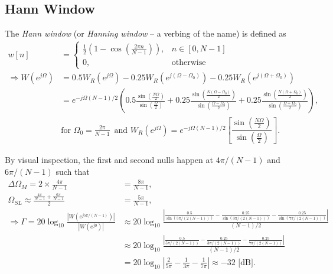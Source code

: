 \documentclass{report}
\begin{document}
\subsection{Hann Window}
The \emph{Hann window} (or \emph{Hanning window} -- a verbing of the name) is defined as 
\begin{align}
    w[n] &= \begin{cases}
        \frac{1}{2}\left(1-\cos\left(\frac{2\pi n}{N-1}\right)\right), & n\in[0,N-1] \\
        0, & \text{otherwise}
    \end{cases} \\
    \Longrightarrow W(e^{j\Omega}) &= 0.5W_R(e^{j\Omega}) - 0.25W_R(e^{j(\Omega-\Omega_0)}) - 0.25W_R(e^{j(\Omega+\Omega_0)}) \nonumber \\
    &= e^{-j\Omega(N-1)/2} \left(0.5\frac{\sin\left(\frac{N\Omega}{2}\right)}{\sin\left(\frac{\Omega}{2}\right)}+0.25\frac{\sin\left(\frac{N\left(\Omega-\Omega_0\right)}{2}\right)}{\sin\left(\frac{\Omega-\Omega_0}{2}\right)}+0.25\frac{\sin\left(\frac{N\left(\Omega+\Omega_0\right)}{2}\right)}{\sin\left(\frac{\Omega+\Omega_0}{2}\right)}\right), \nonumber \\
    &\text{for } \Omega_0 = \frac{2\pi}{N-1}\, \text{ and } W_R(e^{j\Omega}) = e^{-j\Omega(N-1)/2}\left[\dfrac{\sin\left(\frac{N\Omega}{2}\right)}{\sin\left(\frac{\Omega}{2}\right)}\right].
\end{align}
\begin{center}
\end{center}
By visual inspection, the first and second nulls happen at $4\pi/(N-1)$ and $6\pi/(N-1)$ such that
\begin{align*}
    \Delta\Omega_M = 2 \times \frac{4\pi}{N-1} &= \frac{8\pi}{N-1}, \\
    \Omega_{SL} \approx \frac{\frac{4\pi}{N-1}+\frac{6\pi}{N-1}}{2} &= \frac{5\pi}{N-1}, \\
    \Longrightarrow\Gamma = 20 \log_{10}\frac{|W(e^{j5\pi/(N-1)})|}{|W(e^{j0})|} &\approx 20\log_{10} \frac{\left|\frac{0.5}{\sin(5\pi/(2(N-1)))}-\frac{0.25}{\sin(3\pi/(2(N-1)))}-\frac{0.25}{\sin(7\pi/(2(N-1)))}\right|}{(N-1)/2} \\
    &\approx 20 \log_{10}\frac{\left|\frac{0.5}{5\pi/(2(N-1))}-\frac{0.25}{3\pi/(2(N-1))}-\frac{0.25}{7\pi/(2(N-1))}\right|}{(N-1)/2} \\
    &= 20 \log_{10}\left|\frac{2}{5\pi}-\frac{1}{3\pi}-\frac{1}{7\pi}\right| \approx -32 \text{ [dB]}.
\end{align*}
\end{document}
